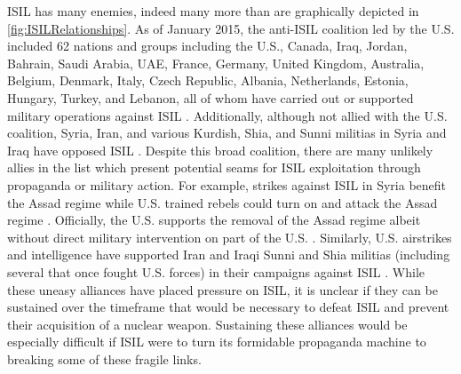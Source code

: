 \documentclass{report}
\begin{document}
ISIL has many enemies, indeed many more than are graphically depicted in \autoref{fig:ISILRelationships}.  As of January 2015, the anti-ISIL coalition led by the U.S. included 62 nations and groups including the U.S., Canada, Iraq, Jordan, Bahrain, Saudi Arabia, UAE, France, Germany, United Kingdom, Australia, Belgium, Denmark, Italy, Czech Republic, Albania, Netherlands, Estonia, Hungary, Turkey, and Lebanon, all of whom have carried out or supported military operations against ISIL \cite{Wordsworth2015}.  Additionally, although not allied with the U.S. coalition, Syria, Iran, and various Kurdish, Shia, and Sunni militias in Syria and Iraq have opposed ISIL \cite{Mooney2014}.  Despite this broad coalition, there are many unlikely allies in the list which present potential seams for ISIL exploitation  through propaganda or military action.  For example, strikes against ISIL in Syria benefit the Assad regime while U.S. trained rebels could turn on and attack the Assad regime \cite{Shinkman2015}.  Officially, the U.S. supports the removal of the Assad regime albeit without direct military intervention on part of the U.S. \cite{Shinkman2015}.  Similarly, U.S. airstrikes and intelligence have supported Iran and Iraqi Sunni and Shia militias (including several that once fought U.S. forces) in their campaigns against ISIL \cite{Chulov2014}.  While these uneasy alliances have placed pressure on ISIL, it is unclear if they can be sustained over the timeframe that would be necessary to defeat ISIL and prevent their acquisition of a nuclear weapon. Sustaining these alliances would be especially difficult if ISIL were to turn its formidable propaganda machine to breaking some of these fragile links.
\end{document}
